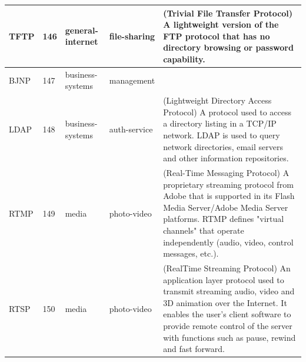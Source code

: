 \begin{longtable}{p{}|p{}|p{}|p{}|p{}}
    TFTP &	146 &	general-internet &	file-sharing &	(Trivial File Transfer Protocol) A lightweight version of the FTP protocol that has no directory browsing or password capability.\\ \hline	
    BJNP &	147 &	business-systems &	management &	\\ \hline	
    LDAP &	148 &	business-systems &	auth-service &	(Lightweight Directory Access Protocol) A protocol used to access a directory listing in a TCP/IP network. LDAP is used to query network directories, email servers and other information repositories. \\ \hline	
    RTMP &	149 &	media &	photo-video &	(Real-Time Messaging Protocol) A proprietary streaming protocol from Adobe that is supported in its Flash Media Server/Adobe Media Server platforms. RTMP defines "virtual channels" that operate independently (audio, video, control messages, etc.).\\ \hline	
    RTSP &	150 &	media &	photo-video &	(RealTime Streaming Protocol) An application layer protocol used to transmit streaming audio, video and 3D animation over the Internet. It enables the user's client software to provide remote control of the server with functions such as pause, rewind and fast forward.\\ \hline	    
\end{longtable}

